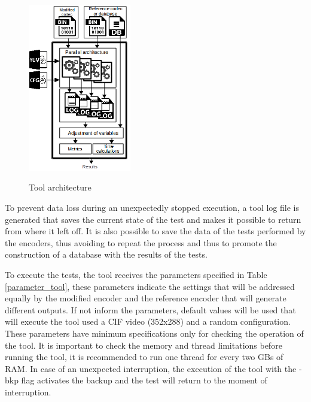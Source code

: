 \documentclass{acm_proc_article-sp}
\begin{document}
\FloatBarrier
\begin{figure}[!ht]
	\centering
	\caption{Tool architecture}
	\includegraphics[width=0.4\textwidth]{figures/fluxo.png}
	\label{fig:fluxo}	
\end{figure}
\FloatBarrier

To prevent data loss during an unexpectedly stopped execution, a tool log file is generated that saves the current state of the test and makes it possible to return from where it left off. It is also possible to save the data of the tests performed by the encoders, thus avoiding to repeat the process and thus to promote the construction of a database with the results of the tests.

To execute the tests, the tool receives the parameters specified in Table \ref{parameter_tool}, these parameters indicate the settings that will be addressed equally by the modified encoder and the reference encoder that will generate different outputs. If not inform the parameters, default values will be used that will execute the tool used a CIF video (352x288) and a random configuration. 
These parameters have minimum specifications only for checking the operation of the tool. It is important to check the memory and thread limitations before running the tool, it is recommended to run one thread for every two GBs of RAM. In case of an unexpected interruption, the execution of the tool with the -bkp flag activates the backup and the test will return to the moment of interruption.

\FloatBarrier
\end{document}

